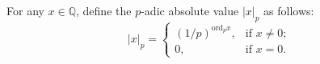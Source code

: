For any $x \in \mathbb{Q}$, define the $p$-adic absolute value $|x|_p$ as follows:
$$|x|_p = \begin{cases} (1/p)^{\text{ord}_p x}, & \text{if } x \neq 0; \\ 0, & \text{if } x = 0. \end{cases}$$
